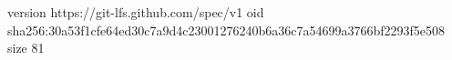 version https://git-lfs.github.com/spec/v1
oid sha256:30a53f1cfe64ed30c7a9d4c23001276240b6a36c7a54699a3766bf2293f5e508
size 81
